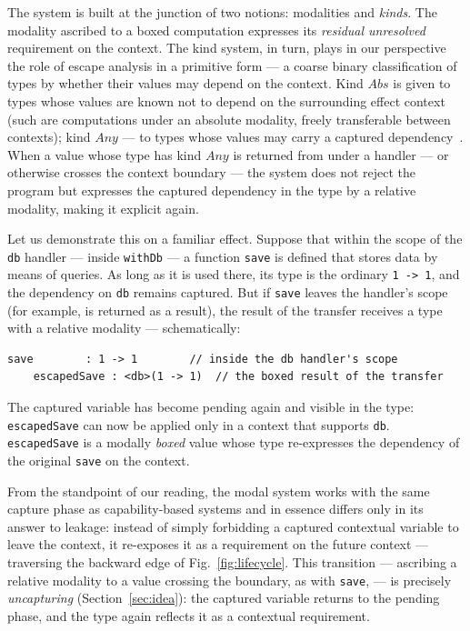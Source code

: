 \documentclass[11pt]{article}
\begin{document}
The system is built at the junction of two notions: modalities and \emph{kinds}.
The modality ascribed to a boxed
computation expresses its \emph{residual unresolved} requirement on the context.
The kind system, in turn, plays in our perspective the role of escape analysis in a primitive form ---
a coarse binary classification of types by whether their values may depend on the context. Kind $Abs$
is given to types whose values are known not to depend
on the surrounding effect context (such are computations under an absolute modality,
freely transferable between contexts); kind $Any$ --- to types whose values may
carry a captured dependency~\cite{tang2025modal}.
When a value whose type has kind $Any$ is returned from under a handler --- or
otherwise crosses the context boundary --- the system does not reject the program but expresses the captured dependency in
the type by a relative modality, making it explicit again.

Let us demonstrate this on a familiar effect. Suppose that within the scope of the
\texttt{db} handler --- inside \texttt{withDb} --- a function
\texttt{save} is defined that stores data by means of queries.
As long as it is used there, its type is the ordinary \texttt{1 -> 1}, and the dependency
on \texttt{db} remains captured. But if \texttt{save}
leaves the handler's scope (for example, is returned as a result), the result of the
transfer receives a type with a relative modality --- schematically:
\begin{lstlisting}[language=modal]
    save        : 1 -> 1        // inside the db handler's scope
    escapedSave : <db>(1 -> 1)  // the boxed result of the transfer
\end{lstlisting}
The captured variable has become pending again and visible in the type:
\texttt{escapedSave} can now be applied only in a context that supports \texttt{db}.
\texttt{escapedSave} is a modally \emph{boxed} value whose type re-expresses
the dependency of the original \texttt{save} on the context.

From the standpoint of our reading, the modal system works with the same capture phase as
capability-based systems and in essence differs only in its answer to leakage: instead
of simply forbidding a captured contextual variable to leave the context, it
re-exposes it as a requirement on the future context --- traversing the backward edge of
Fig.~\ref{fig:lifecycle}. This transition --- ascribing a relative modality to a value
crossing the boundary, as with \texttt{save}, --- is precisely \emph{uncapturing}
(Section~\ref{sec:idea}): the captured variable returns to the pending phase, and the
type again reflects it as a contextual requirement.
\end{document}
